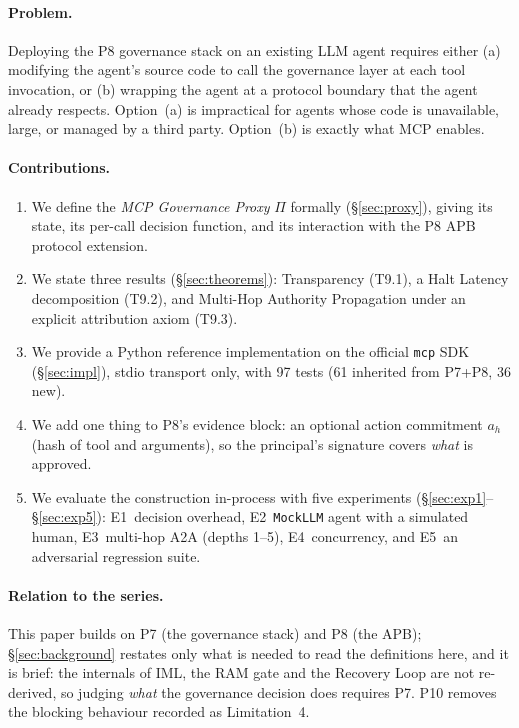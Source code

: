 \documentclass[11pt]{article}
\newcommand{\ahash}{a_h}   %
\newcommand{\Proxy}{\Pi}
\begin{document}
\paragraph{Problem.}
Deploying the P8 governance stack on an existing LLM agent requires
either (a) modifying the agent's source code to call the governance
layer at each tool invocation, or (b) wrapping the agent at a protocol
boundary that the agent already respects. Option~(a) is impractical
for agents whose code is unavailable, large, or managed by a third
party. Option~(b) is exactly what MCP enables.

\paragraph{Contributions.}
\begin{enumerate}[leftmargin=2em, topsep=2pt, itemsep=2pt]
  \item We define the \emph{MCP Governance Proxy} $\Proxy$ formally
        (\S\ref{sec:proxy}), giving its state, its per-call decision
        function, and its interaction with the P8 APB protocol extension.
  \item We state three results (\S\ref{sec:theorems}): Transparency
        (T9.1), a Halt Latency decomposition (T9.2), and Multi-Hop
        Authority Propagation under an explicit attribution axiom (T9.3).
  \item We provide a Python reference implementation on the official
        \texttt{mcp} SDK (\S\ref{sec:impl}), stdio transport only, with
        97 tests (61 inherited from P7+P8, 36 new).
  \item We add one thing to P8's evidence block: an optional action
        commitment $\ahash$ (hash of tool and arguments), so the
        principal's signature covers \emph{what} is approved.
  \item We evaluate the construction in-process with five experiments
        (\S\ref{sec:exp1}--\S\ref{sec:exp5}):
        E1~decision overhead, E2~\texttt{MockLLM} agent with a simulated
        human, E3~multi-hop A2A (depths 1--5), E4~concurrency, and
        E5~an adversarial regression suite.
\end{enumerate}

\paragraph{Relation to the series.}
This paper builds on P7 (the governance stack) and P8 (the APB); \S\ref{sec:background}
restates only what is needed to read the definitions here, and it is
brief: the internals of IML, the RAM gate and the Recovery Loop are not
re-derived, so judging \emph{what} the governance decision does requires
P7. P10 \citep{fernandez2026nbg} removes the blocking behaviour recorded
as Limitation~4.
\end{document}
